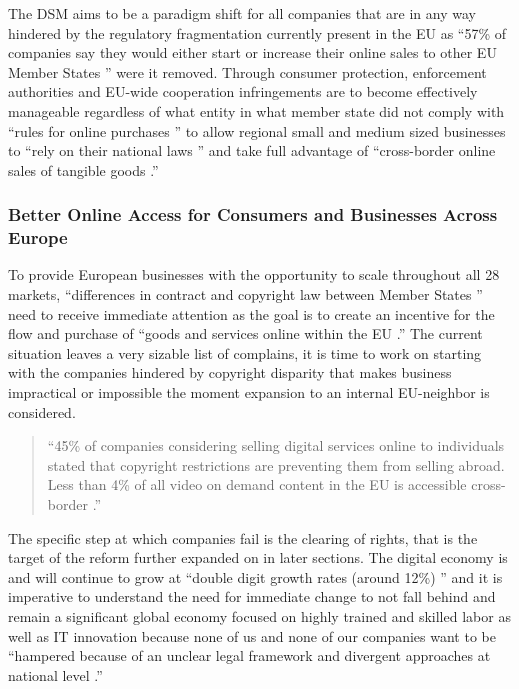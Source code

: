 \documentclass[a4paper]{article}
\begin{document}
\noindent
The DSM aims to be a paradigm shift for all companies that are in any way hindered by the regulatory fragmentation currently present in the EU as ``57\% of companies say they would either start or increase their online sales to other EU Member States \cite{DSM}'' were it removed. Through consumer protection, enforcement authorities and EU-wide cooperation infringements are to become effectively manageable regardless of what entity in what member state did not comply with ``rules for online purchases \cite{DSM}'' to allow regional small and medium sized businesses to ``rely on their national laws \cite{DSM}'' and take full advantage of ``cross-border online sales of tangible goods \cite{DSM}.'' 

\subsubsection{Better Online Access for Consumers and Businesses Across Europe}

To provide European businesses with the opportunity to scale throughout all 28 markets, ``differences in contract and copyright law between Member States \cite{DSM}'' need to receive immediate attention as the goal is to create an incentive for the flow and purchase of ``goods and services online within the EU \cite{DSM}.'' The current situation leaves a very sizable list of complains, it is time to work on starting with the companies hindered by copyright disparity that makes business impractical or impossible the moment expansion to an internal EU-neighbor is considered. \\
\begin{quote}
``45\%  of  companies  considering  selling  digital  services  online  to  individuals  stated  that  copyright restrictions are preventing them from selling abroad. Less than 4\% of all video on demand content in the EU is accessible cross-border \cite{DSM}.''\\
\end{quote}

\noindent
The specific step at which companies fail is the clearing of rights, that is the target of the reform further expanded on in later sections. The digital economy is and will continue to grow at ``double digit growth rates (around 12\%) \cite{DSM}'' and it is imperative to understand the need for immediate change to not fall behind and remain a significant global economy focused on highly trained and skilled labor as well as IT innovation because none of us and none of our companies want to be ``hampered because of an unclear legal framework and divergent approaches at national level \cite{DSM}.'' 
\end{document}
